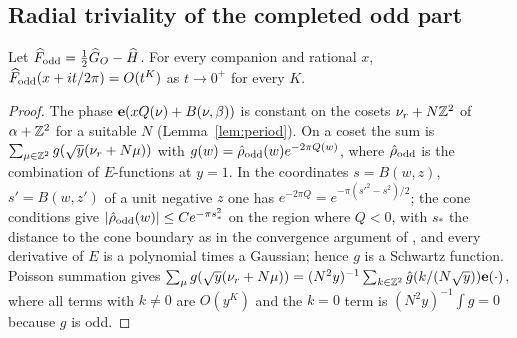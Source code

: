 \subsection{Radial triviality of the completed odd part}
\begin{theorem}\label{thm:radtriv}
Let $\widehat F_{\rm odd}=\frac12\widehat G_O-\widehat H$. For every companion and rational $x$, $\widehat F_{\rm odd}(x+it/2\pi)=O(t^K)$ as $t\to0^+$ for every $K$.
\end{theorem}
\begin{proof}
The phase $\mathbf{e}(xQ(\nu)+B(\nu,\beta))$ is constant on the cosets $\nu_r+N\mathbb{Z}^2$ of $\alpha+\mathbb{Z}^2$ for a suitable $N$ (Lemma~\ref{lem:period}). On a coset the sum is
$\sum_{\mu\in\mathbb{Z}^2}g(\sqrt y(\nu_r+N\mu))$ with $g(w)=\hat\rho_{\rm odd}(w)e^{-2\pi Q(w)}$, where $\hat\rho_{\rm odd}$ is the combination of $E$-functions at $y=1$. In the
coordinates $s=B(w,z)$, $s'=B(w,z')$ of a unit negative $z$ one has $e^{-2\pi Q}=e^{-\pi(s'^2-s^2)/2}$; the cone conditions give $|\hat\rho_{\rm odd}(w)|\le Ce^{-\pi s_*^2}$ on
the region where $Q<0$, with $s_*$ the distance to the cone boundary as in the convergence argument of \cite[Prop.~2.4]{Zw}, and every derivative of $E$ is a polynomial times a Gaussian;
hence $g$ is a Schwartz function. Poisson summation gives $\sum_\mu g(\sqrt y(\nu_r+N\mu))=(N^2y)^{-1}\sum_{k\in\mathbb{Z}^2}\hat g(k/(N\sqrt y))\mathbf{e}(\cdot)$, where all terms with
$k\ne0$ are $O(y^K)$ and the $k=0$ term is $(N^2y)^{-1}\int g=0$ because $g$ is odd.
\end{proof}

